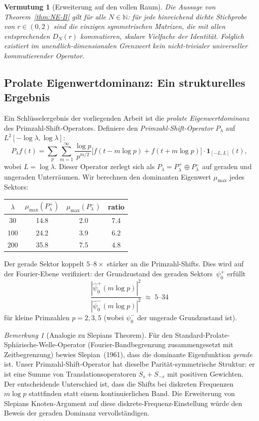 ﻿\documentclass[12pt,a4paper]{article}
\newtheorem{conjecture}[theorem]{Vermutung}
\theoremstyle{definition}
\theoremstyle{remark}
\newtheorem{remark}[theorem]{Bemerkung}
\begin{document}
\begin{conjecture}[Erweiterung auf den vollen Raum]\label{conj:NE-B-full-de}
Die Aussage von Theorem~\ref{thm:NE-B} gilt für alle $N \in \mathbb{N}$: für jede hinreichend dichte Stichprobe von $r \in (0,2)$ sind die einzigen symmetrischen Matrizen, die mit allen entsprechenden $D_N(r)$ kommutieren, skalare Vielfache der Identität. Folglich existiert im unendlich-dimensionalen Grenzwert kein nicht-trivialer universeller kommutierender Operator.
\end{conjecture}

\subsection{Prolate Eigenwertdominanz: Ein strukturelles Ergebnis}

Ein Schlüsselergebnis der vorliegenden Arbeit ist die \emph{prolate Eigenwertdominanz} des Primzahl-Shift-Operators. Definiere den \emph{Primzahl-Shift-Operator} $P_\lambda$ auf $L^2[-\log\lambda, \log\lambda]$:
\[ P_\lambda f(t) = \sum_p \sum_{m=1}^\infty \frac{\log p}{p^{m/2}} \bigl[f(t - m\log p) + f(t + m\log p)\bigr] \cdot \mathbf{1}_{[-L,L]}(t), \]
wobei $L = \log\lambda$. Dieser Operator zerlegt sich als $P_\lambda = P_\lambda^+ \oplus P_\lambda^-$ auf geraden und ungeraden Unterräumen. Wir berechnen den dominanten Eigenwert $\mu_{\max}$ jedes Sektors:

\begin{center}
\begin{tabular}{cccc}
$\lambda$ & $\mu_{\max}(P_\lambda^+)$ & $\mu_{\max}(P_\lambda^-)$ & ratio \\
\hline
30  & 14.8 &  2.0 & 7.4 \\
100 & 24.2 &  3.9 & 6.2 \\
200 & 35.8 &  7.5 & 4.8
\end{tabular}
\end{center}

Der gerade Sektor koppelt $5$--$8\times$ stärker an die Primzahl-Shifts.
Dies wird auf der Fourier-Ebene verifiziert: der Grundzustand des geraden
Sektors~$\psi_0^+$ erfüllt
\[
  \frac{|\hat\psi_0^+(m\log p)|^2}{|\hat\psi_0^-(m\log p)|^2}
  \;\approx\; 5\text{--}34
\]
für kleine Primzahlen $p = 2,3,5$ (wobei $\psi_0^-$ der ungerade
Grundzustand ist).

\begin{remark}[Analogie zu Slepians Theorem]
Für den Standard-Prolate-Sphärische-Welle-Operator (Fourier-Bandbegrenzung zusammengesetzt mit Zeitbegrenzung) bewies Slepian~(1961), dass die dominante Eigenfunktion \emph{gerade} ist. Unser Primzahl-Shift-Operator hat dieselbe Parität-symmetrische Struktur: er ist eine Summe von Translationsoperatoren $S_s + S_{-s}$ mit positiven Gewichten. Der entscheidende Unterschied ist, dass die Shifts bei diskreten Frequenzen $m\log p$ stattfinden statt einem kontinuierlichen Band. Die Erweiterung von Slepians Knoten-Argument auf diese diskrete-Frequenz-Einstellung würde den Beweis der geraden Dominanz vervollständigen.
\end{remark}
\end{document}
